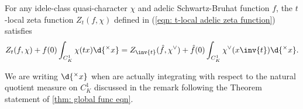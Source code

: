 \documentclass[11pt, x11names, openany]{book}
\begin{document}
\begin{lemma}
\label{lemma: Z_t(f, chi) functional equation}
For any idele-class quasi-character $\chi$ and adelic Schwartz-Bruhat function $f$, the $t$-local zeta function $Z_t(f, \chi)$ defined in (\ref{eqn: t-local adelic zeta function}) satisfies
\begin{equation*}
    Z_t(f, \chi) + f(0) \int_{C^1_K} \chi(tx)\d{^\times x} = Z_{\inv{t}}(\hat{f}, \chi^\lor) + \hat{f}(0) \int_{C_K^1} \chi^\lor(x\inv{t}) \d{^\times x}. 
\end{equation*}
\end{lemma}
\begin{warning}
We are writing $\d{^\times x}$ when are actually integrating with respect to the natural quotient measure on $C^1_K$ discussed in the remark following the Theorem statement of \ref{thm: global func eqn}.
\end{warning}
\end{document}
